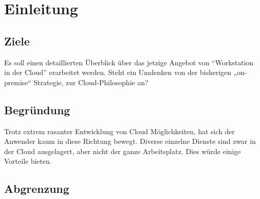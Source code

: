 \chapter{Einleitung}

\section{Ziele}
Es soll einen detaillierten Überblick über das jetzige Angebot von “Workstation in der Cloud” erarbeitet werden. 
Steht ein Umdenken von der bisherigen „on-premise“ Strategie, zur Cloud-Philosophie an?

\section{Begründung}
Trotz extrem rasanter Entwicklung von Cloud Möglichkeiten, hat sich der Anwender kaum in diese Richtung bewegt.
Diverse einzelne Dienste sind zwar in der Cloud ausgelagert, aber nicht der ganze Arbeitsplatz. Dies würde einige Vorteile bieten.

\section{Abgrenzung}
